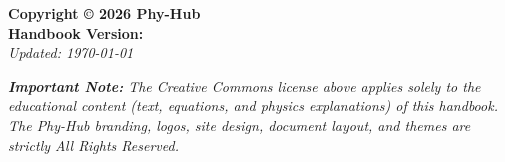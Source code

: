 \clearpage
\thispagestyle{empty}

\vspace*{\fill}

\noindent
\textbf{Copyright \copyright{} 2026 Phy-Hub}\\[0.5em]
\textbf{Handbook Version: \version} \\
\textit{Updated: \today}

\vspace{1.5em}

\noindent
\doclicenseThis

\vspace{1em} %

\noindent
\small\textit{\textbf{Important Note:} The Creative Commons license above applies solely to the educational content (text, equations, and physics explanations) of this handbook. The Phy-Hub branding, logos, site design, document layout, and themes are strictly All Rights Reserved.}
\normalsize

\clearpage